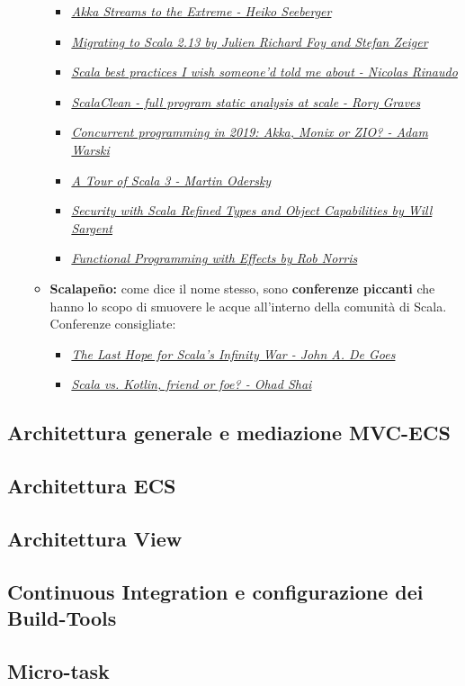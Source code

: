 \begin{itemize}
\begin{itemize}
\begin{itemize}
			\item{\emph{\href{https://www.youtube.com/watch?v=CrpJJYPzdJE&t=630s}{Akka Streams to the Extreme - Heiko Seeberger}}}
			\item{\emph{\href{https://www.youtube.com/watch?v=pHHKUKubs1Q&t=2002s}{Migrating to Scala 2.13 by Julien Richard Foy and Stefan Zeiger}}}
			\item{\emph{\href{https://www.youtube.com/watch?v=DGa58FfiMqc}{Scala best practices I wish someone'd told me about - Nicolas Rinaudo}}}
			\item{\emph{\href{https://www.youtube.com/watch?v=I6pFxyL9Crc}{ScalaClean - full program static analysis at scale - Rory Graves}}}
			\item{\emph{\href{https://www.youtube.com/watch?v=TqJg4AuxEIQ}{Concurrent programming in 2019: Akka, Monix or ZIO? - Adam Warski}}}
			\item{\emph{\href{https://www.youtube.com/watch?v=_Rnrx2lo9cw}{A Tour of Scala 3 - Martin Odersky}}}
			\item{\emph{\href{https://www.youtube.com/watch?v=wfbF5jQiAhQ}{Security with Scala Refined Types and Object Capabilities by Will Sargent}}}
			\item{\emph{\href{https://www.youtube.com/watch?v=30q6BkBv5MY}{Functional Programming with Effects by Rob Norris}}}
		 \end{itemize} 
		\item{\textbf{Scalapeño:}} come dice il nome stesso, sono \textbf{conferenze piccanti} che hanno lo scopo di smuovere le acque all'interno della comunità di Scala.
		Conferenze consigliate:
		\begin{itemize}
			\item{\emph{\href{https://www.youtube.com/watch?v=v8IQ-X2HkGE}{The Last Hope for Scala's Infinity War - John A. De Goes}}}
			\item{\emph{\href{https://www.youtube.com/watch?v=Arwb6DSrWXE&t=102s}{Scala vs. Kotlin, friend or foe? - Ohad Shai}}}
		 \end{itemize} 
	\end{itemize}
\end{itemize}


\subsection{Architettura generale e mediazione MVC-ECS}
\subsection{Architettura ECS}
\subsection{Architettura View}
\subsection{Continuous Integration e configurazione dei Build-Tools}
\subsection{Micro-task}
